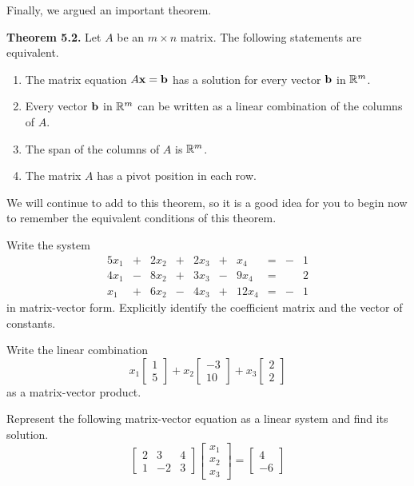 Finally, we argued an important theorem.

\noindent \textbf{Theorem 5.2.} Let $A$ be an $m \times n$ matrix. The following statements are equivalent.
    \begin{enumerate}
    \item The matrix equation $A \mathbf{x} = \mathbf{b}$ has a solution for every vector $\mathbf{b}$ in $\mathbb{R}^m$.
    \item Every vector $\mathbf{b}$ in $\mathbb{R}^m$ can be written as a linear combination of the columns of $A$.
    \item The span of the columns of $A$ is $\mathbb{R}^m$.
    \item The matrix $A$ has a pivot position in each row.
    \end{enumerate}


We will continue to add to this theorem, so it is a good idea for you to begin now to remember the equivalent conditions of this theorem.




\label{sec:mv_form_exer}

\be
\item Write the system 
\begin{alignat*}{5}
x_1 		&{}+{} 	&{2}x_2 	&{}+{}	&{2}x_3 	&{}+{}	&{}x_4		&{}={}	&{}- &1 \\
{4}x_1 	&{}-{} 	&{8}x_2		&{}+{}	&{3}x_3 	&{}-{}	&{9}x_4		&{}={}	&{} &2 \\
{}x_1 	&{}+{} 	&{6}x_2 	&{}-{}	&{4}x_3		&{}+{}	&{12}x_4	&{}={}	&{}- &1 
\end{alignat*}
in matrix-vector form. Explicitly identify the coefficient matrix and the vector of constants. 

\item Write the linear combination 
\[x_1\left[ \begin{array}{c} 1\\5 \end{array} \right] + x_2\left[ \begin{array}{r} -3\\10 \end{array} \right] + x_3\left[ \begin{array}{c} 2\\2 \end{array} \right] \]
as a matrix-vector product.


\item Represent the following matrix-vector equation as a linear system and find its solution.
\[ \left[ \begin{array}{crc} 2 & 3 & 4 \\ 1 & -2 & 3  \end{array} \right] \left[ \begin{array}{c} x_1 \\ x_2 \\ x_3 \end{array} \right] = \left[ \begin{array}{r} 4\\-6 \end{array} \right] \]

